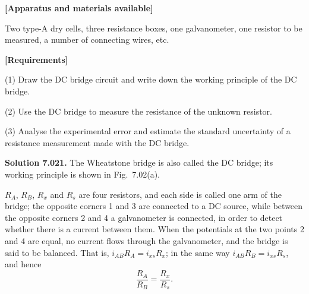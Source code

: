 \textbf{[Apparatus and materials available]}

Two type-A dry cells, three resistance boxes, one galvanometer, one resistor to be measured, a number of connecting wires, etc.

\textbf{[Requirements]}

(1) Draw the DC bridge circuit and write down the working principle of the DC bridge.

(2) Use the DC bridge to measure the resistance of the unknown resistor.

(3) Analyse the experimental error and estimate the standard uncertainty of a resistance measurement made with the DC bridge.

\textbf{Solution 7.02}\quad \textbf{1.} The Wheatstone bridge is also called the DC bridge; its working principle is shown in Fig.~7.02(a).

$R_A$, $R_B$, $R_x$ and $R_s$ are four resistors, and each side is called one arm of the bridge; the opposite corners 1 and 3 are connected to a DC source, while between the opposite corners 2 and 4 a galvanometer is connected, in order to detect whether there is a current between them. When the potentials at the two points 2 and 4 are equal, no current flows through the galvanometer, and the bridge is said to be balanced. That is, $i_{AB}R_A=i_{xs}R_x$; in the same way $i_{AB}R_B=i_{xs}R_s$, and hence
\begin{equation}
\frac{R_A}{R_B}=\frac{R_x}{R_s}. \tag{1}
\end{equation}

